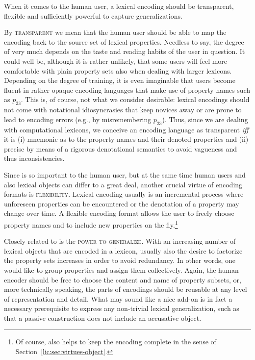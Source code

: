 \documentclass[output=paper
,modfonts
,nonflat
,biblatexbackend=biber
]{langsci/langscibook}
\begin{document}
When it comes to the human user, a lexical encoding should be transparent, flexible and sufficiently powerful to capture generalizations.

By \textsc{transparent} we mean that the human user should be able to map the encoding back to the source set of lexical properties. Needless to say, the degree of  very much depends on the taste and reading habits of the user in question. It could well be, although it is rather unlikely, that some users will feel more comfortable with plain property sets also when dealing with larger lexicons. Depending on the degree of training, it is even imaginable that users become fluent in rather opaque encoding languages that make use of property names such as $p_{23}$. This is, of course, not what we consider desirable: lexical encodings should not come with notational idiosyncrasies that keep novices away or are prone to lead to encoding errors (e.g., by misremembering $p_{23}$). Thus, since we are dealing with computational lexicons, we conceive an encoding language as transparent \textit{iff} it is (i) mnemonic as to the property names and their denoted properties and (ii) precise by means of a rigorous denotational semantics to avoid vagueness and thus inconsistencies. 

Since  is so important to the human user, but at the same time human users and also lexical objects can differ to a great deal, another crucial virtue of encoding formats is \textsc{flexibility}. Lexical encoding usually is an incremental process where unforeseen properties can be encountered or the denotation of a property may change over time. A flexible encoding format allows the user to freely choose property names and to include new properties on the fly.\footnote{Of course,  also helps to keep the encoding complete in the sense of Section~\ref{lic:sec:virtues-object}.} 

Closely related to  is the \textsc{power to generalize}. With an increasing number of lexical objects that are encoded in a lexicon, usually also the desire to factorize the property sets increases in order to avoid redundancy. In other words, one would like to group properties and assign them collectively. Again, the human encoder should be free to choose the content and name of property subsets, or, more technically speaking, the parts of encodings should be reusable at any level of representation and detail. What may sound like a nice add-on is in fact a necessary prerequisite to express any non-trivial lexical generalization, such as that a passive construction does not include an accusative object.
\end{document}
